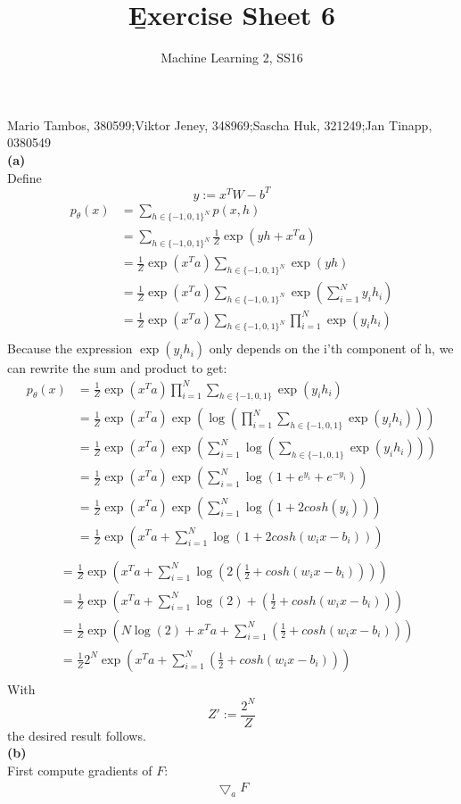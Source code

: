 \documentclass[a4paper]{article}
\newcommand{\1}{\mathds{1}}
\begin{document}
\title{\b{Exercise Sheet 6}}
\author{Machine Learning 2, SS16}

\maketitle

Mario Tambos, 380599;\quad Viktor Jeney, 348969;\quad Sascha Huk, 321249;\quad Jan Tinapp, 0380549\\


\textbf{(a)}\\
Define
\[ y:=x^TW-b^T \]
\begin{align*}
p_{\theta}(x)&=\sum_{h\in\{-1,0,1\}^N}p(x,h)\\
&=\sum_{h\in\{-1,0,1\}^N}\frac{1}{Z}\exp(yh+x^Ta)\\
&=\frac{1}{Z}\exp(x^Ta)\sum_{h\in\{-1,0,1\}^N}\exp(yh)\\
&=\frac{1}{Z}\exp(x^Ta)\sum_{h\in\{-1,0,1\}^N}\exp(\sum_{i=1}^{N}y_ih_i)\\
&=\frac{1}{Z}\exp(x^Ta)\sum_{h\in\{-1,0,1\}^N}\prod_{i=1}^{N}\exp(y_ih_i)\\
\end{align*}
Because the expression $\exp(y_ih_i)$ only depends on the i'th component of h, we can rewrite the sum and product to get:
\begin{align*}
p_{\theta}(x)&=\frac{1}{Z}\exp(x^Ta)\prod_{i=1}^{N}\sum_{h\in\{-1,0,1\}}\exp(y_ih_i)\\
&=\frac{1}{Z}\exp(x^Ta)\exp(\log(\prod_{i=1}^{N}\sum_{h\in\{-1,0,1\}}\exp(y_ih_i)))\\
&=\frac{1}{Z}\exp(x^Ta)\exp(\sum_{i=1}^{N}\log(\sum_{h\in\{-1,0,1\}}\exp(y_ih_i)))\\
&=\frac{1}{Z}\exp(x^Ta)\exp(\sum_{i=1}^{N}\log(1+e^{y_i}+e^{-y_i}))\\
&=\frac{1}{Z}\exp(x^Ta)\exp(\sum_{i=1}^{N}\log(1+2cosh(y_i)))\\
&=\frac{1}{Z}\exp(x^Ta+\sum_{i=1}^{N}\log(1+2cosh(w_ix-b_i)))\\
\end{align*}
\begin{align*}
&=\frac{1}{Z}\exp(x^Ta+\sum_{i=1}^{N}\log(2(\frac{1}{2}+cosh(w_ix-b_i))))\\
&=\frac{1}{Z}\exp(x^Ta+\sum_{i=1}^{N}\log(2)+(\frac{1}{2}+cosh(w_ix-b_i)))\\
&=\frac{1}{Z}\exp(N\log(2)+x^Ta+\sum_{i=1}^{N}(\frac{1}{2}+cosh(w_ix-b_i)))\\
&=\frac{1}{Z}2^N\exp(x^Ta+\sum_{i=1}^{N}(\frac{1}{2}+cosh(w_ix-b_i)))\\
\end{align*}
With \[ Z':=\frac{2^N}{Z} \]
the desired result follows.\\
\textbf{(b)}\\
First compute gradients of $F$:
\begin{align*}
\bigtriangledown_aF
\end{align*}
\end{document}
